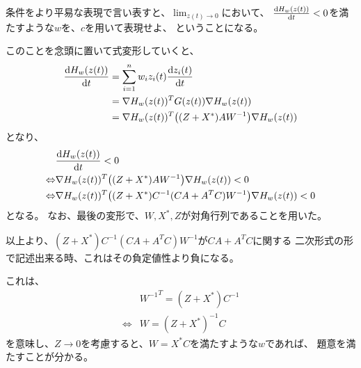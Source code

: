 \documentclass[a4paper, 10pt, dvipdfmx]{jlreq}
\begin{document}
条件をより平易な表現で言い表すと、$\lim_{z(t) \to 0}$において、
$\dv{H_w(z(t))}{t}<0$を満たすような$w$を、$c$を用いて表現せよ、
ということになる。

このことを念頭に置いて式変形していくと、
\begin{align*}
  \dv{H_w(z(t))}{t} & =\sum_{i=1}^{n}{w_iz_i(t)\dv{z_i(t)}{t}}                \\
                    & =\nabla H_w(z(t))^TG(z(t))\nabla H_w(z(t))              \\
                    & =\nabla H_w(z(t))^T\qty((Z+X^*)AW^{-1})\nabla H_w(z(t))
\end{align*}
となり、
\begin{align*}
                  & \dv{H_w(z(t))}{t}<0                                                    \\
  \Leftrightarrow & \nabla H_w(z(t))^T\qty((Z+X^*)AW^{-1})\nabla H_w(z(t))<0               \\
  \Leftrightarrow & \nabla H_w(z(t))^T\qty((Z+X^*)C^{-1}(CA+A^TC)W^{-1})\nabla H_w(z(t))<0
\end{align*}
となる。
なお、最後の変形で、$W,X^*,Z$が対角行列であることを用いた。

以上より、$(Z+X^*)C^{-1}(CA+A^TC)W^{-1}$が$CA+A^TC$に関する
二次形式の形で記述出来る時、これはその負定値性より負になる。

これは、
\begin{align*}
                  & {W^{-1}}^T=(Z+X^*)C^{-1} \\
  \Leftrightarrow & W=(Z+X^*)^{-1}C
\end{align*}
を意味し、$Z \to 0$を考慮すると、$W=X^*C$を満たすような$w$であれば、
題意を満たすことが分かる。
\end{document}
